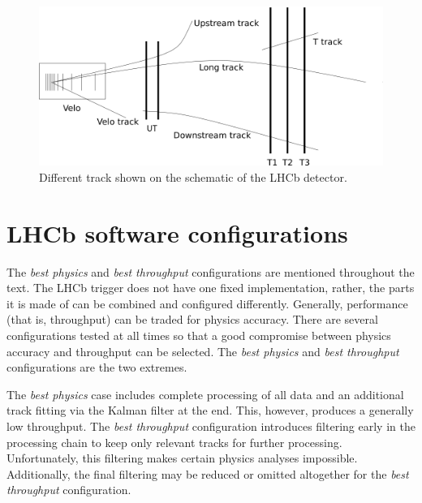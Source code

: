 \documentclass[12pt]{article}
\begin{document}
\begin{figure}[H]
	\begin{center}
		\includegraphics[width=\textwidth]{lhcb_track_types}
	\end{center}
	\caption{Different track shown on the schematic of the LHCb detector.}
	\label{fig_lhcb_track_types}
\end{figure}


\section{LHCb software configurations}

The \textit{best physics} and \textit{best throughput} configurations are mentioned throughout the text. The LHCb trigger does not have one fixed implementation, rather, the parts it is made of can be combined and configured differently. Generally, performance (that is, throughput) can be traded for physics accuracy. There are several configurations tested at all times so that a good compromise between physics accuracy and throughput can be selected. The \textit{best physics} and \textit{best throughput} configurations are the two extremes.

The \textit{best physics} case includes complete processing of all data and an additional track fitting via the Kalman filter at the end. This, however, produces a generally low throughput. The \textit{best throughput} configuration introduces filtering early in the processing chain to keep only relevant tracks for further processing. Unfortunately, this filtering makes certain physics analyses impossible. Additionally, the final filtering may be reduced or omitted altogether for the \textit{best throughput} configuration.


\end{document}
